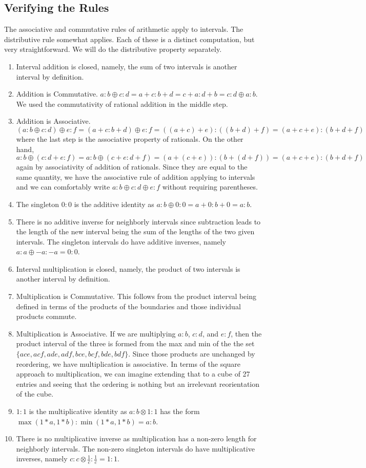 \documentclass[12pt]{article}
\begin{document}
\subsection{Verifying the Rules}\label{sec:rules}

The associative and commutative rules of arithmetic apply to intervals. The distributive rule somewhat applies. Each of these is a distinct computation, but very straightforward. We will do the distributive property separately. 

\begin{enumerate}
    \item Interval addition is closed, namely, the sum of two intervals is another interval by definition. 
    \item Addition is Commutative. $a:b \oplus c:d= a+c : b+d = c+a:d+b = c:d \oplus a:b$. We used the commutativity of rational addition in the middle step. 
    \item Addition is Associative. $(a:b \oplus c:d) \oplus e:f = (a+c:b+d) \oplus e:f = ((a+c)+e):((b+d)+f) = (a+c+e):(b+d+f)$ where the last step is the associative property of rationals.  On the other hand, $a:b \oplus (c:d+e:f) = a:b \oplus (c+e:d+f) = (a+(c+e)):(b+(d+f)) = (a+c+e):(b+d+f)$ again by associativity of addition of rationals. Since they are equal to the same quantity, we have the associative rule of addition applying to intervals and we can comfortably write $a:b \oplus c:d \oplus e:f$ without requiring parentheses. 
    \item The singleton $0:0$ is the additive identity as $a:b \oplus 0:0 = a+0:b+0 = a:b$. 
    \item There is no additive inverse for neighborly intervals since subtraction leads to the length of the new interval being the sum of the lengths of the two given intervals. The singleton intervals do have additive inverses, namely $a:a \oplus -a:-a = 0:0$. 
    \item Interval multiplication is closed, namely, the product of two intervals is another interval by definition. 
    \item Multiplication is Commutative. This follows from the product interval being defined in terms of the products of the boundaries and those individual products commute. 
    \item Multiplication is Associative. If we are multiplying $a:b$, $c:d$, and $e:f$, then the product interval of the three is formed from the max and min of the the set $\{ace, acf, ade, adf, bce, bcf, bde, bdf\}$. Since those products are unchanged by reordering, we have multiplication is associative. In terms of the square approach to multiplication, we can imagine extending that to a cube of 27 entries and seeing that the ordering is nothing but an irrelevant reorientation of the cube. 
    \item $1:1$ is the multiplicative identity as $a:b \otimes 1:1$ has the form $\max(1*a, 1*b):\min(1*a, 1*b) = a:b$. 
    \item There is no multiplicative inverse as multiplication has a non-zero length for neighborly intervals. The non-zero singleton intervals do have multiplicative inverses, namely $c:c  \otimes  \frac{1}{c} : \frac{1}{c} = 1:1$.
\end{enumerate}
\end{document}
